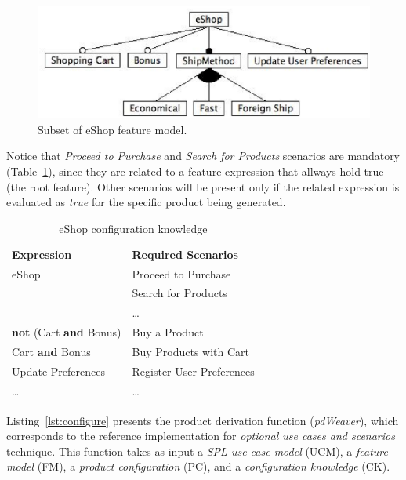 \documentclass[times, 11pt,twocolumn]{article}
\begin{document}
\begin{figure}[h]
 \begin{center}
  \includegraphics[scale=0.40]{../images/eShop-fm-re.eps}
   \caption{Subset of eShop feature model.}
  \label{fig:eshop-fm-re}
  \end{center}
\end{figure}

Notice that \emph{Proceed to Purchase} and \emph{Search for Products} scenarios
are mandatory (Table~\ref{tab:ck-running-example}), since they are related to a feature
expression that allways hold true (the root feature). Other scenarios will
be present only if the related expression is evaluated as \emph{true} for
the specific product being generated.

\begin{table}[tbh]
\begin{center}
 \caption{eShop configuration knowledge}
\label{tab:ck-running-example}
\begin{tabular}{ll}
   \hline\noalign{\smallskip}
  {\bf Expression} & {\bf Required Scenarios} \\
   \noalign{\smallskip}
   \hline
   \noalign{\smallskip}
    eShop & Proceed to Purchase \\
               & Search for Products \\
               & \ldots \\ 
    {\bf not} (Cart {\bf and} Bonus)\hspace{2pt} & Buy a Product \\ 
    Cart {\bf and} Bonus & Buy Products with Cart \\ 
    Update Preferences & Register User Preferences	 \\  
    \ldots & \ldots \\ 
  \hline
\end{tabular}
\end{center}
\end{table}

Listing~\ref{lst:configure} presents the product derivation function
(\emph{pdWeaver}), which corresponds to the reference implementation for
\emph{optional use cases and scenarios} technique. This function takes as input a
\emph{SPL use case model} (UCM), a \emph{feature model} (FM), a \emph{product
configuration} (PC), and a \emph{configuration knowledge} (CK).
\end{document}
